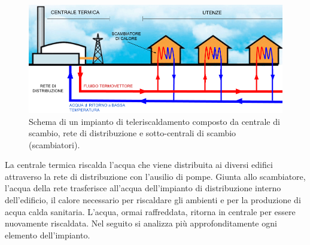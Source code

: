 \documentclass[laurea,oneside,11pt]{USiena_tesiLM3}
\begin{document}
\begin{figure}[!ht]
\centering
\includegraphics[width=1.0\textwidth]{figure/schema_impianto1}
\caption{Schema di un impianto di teleriscaldamento composto da centrale di scambio, rete di distribuzione e sotto-centrali di scambio (scambiatori).}
\label{fig:schema1}
\end{figure}

La centrale termica riscalda l'acqua che viene distribuita ai diversi edifici attraverso la rete di distribuzione con l'ausilio di pompe. Giunta allo scambiatore, l'acqua della rete trasferisce all'acqua dell'impianto di distribuzione interno dell'edificio, il calore necessario per riscaldare gli ambienti e per la produzione di acqua calda sanitaria. L'acqua, ormai raffreddata, ritorna in centrale per essere nuovamente riscaldata. 
Nel seguito si analizza più approfonditamente ogni elemento dell'impianto.
\end{document}
